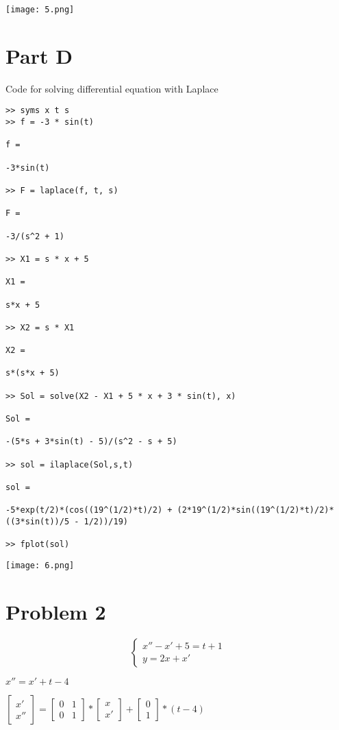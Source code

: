 \documentclass[a4paper,11pt]{article}
\theoremstyle{mytheor}
\begin{document}
\texttt{[image: 5.png]}

\section*{Part D}
Code for solving differential equation with Laplace 
\begin{lstlisting}
>> syms x t s
>> f = -3 * sin(t)
 
f =
 
-3*sin(t)
 
>> F = laplace(f, t, s)
 
F =
 
-3/(s^2 + 1)
 
>> X1 = s * x + 5
 
X1 =
 
s*x + 5
 
>> X2 = s * X1
 
X2 =
 
s*(s*x + 5)
 
>> Sol = solve(X2 - X1 + 5 * x + 3 * sin(t), x)
 
Sol =
 
-(5*s + 3*sin(t) - 5)/(s^2 - s + 5)
 
>> sol = ilaplace(Sol,s,t)
 
sol =
 
-5*exp(t/2)*(cos((19^(1/2)*t)/2) + (2*19^(1/2)*sin((19^(1/2)*t)/2)*((3*sin(t))/5 - 1/2))/19)
 
>> fplot(sol)
\end{lstlisting}

\texttt{[image: 6.png]}

\section*{Problem 2}

\begin{equation}
\begin{cases}
    x''-x'+5=t+1 \\ y = 2x + x'
\end{cases}
\end{equation}

$x''=x'+t-4$ 

$ \begin{bmatrix}x'\\x''\end{bmatrix} = \begin{bmatrix}0&1\\0&1\end{bmatrix} * \begin{bmatrix}x\\x'\end{bmatrix} + \begin{bmatrix}0\\1\end{bmatrix} * (t-4)$
\end{document}
